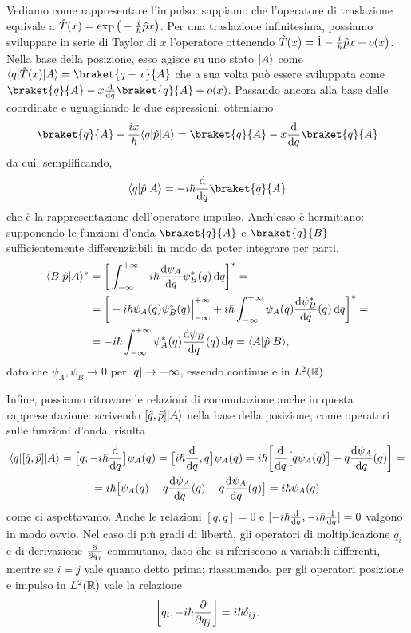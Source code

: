 Vediamo come rappresentare l'impulso: sappiamo che l'operatore di traslazione equivale a $\op T(x)=\exp\big(-\frac{i}{\hbar}\op px\big)$.
Per una traslazione infinitesima, possiamo sviluppare in serie di Taylor di $x$ l'operatore ottenendo $\op T(x)=\op 1-\frac{i}{\hbar}\op px+o(x)$.
Nella base della posizione, esso agisce su uno stato $\ket{A}$ come $\bra{q}\op T(x)\ket{A}=\braket{q-x}{A}$ che a sua volta può essere sviluppata come $\braket{q}{A}-x\drv{}{q}\braket{q}{A}+o(x)$.
Passando ancora alla base delle coordinate e uguagliando le due espressioni, otteniamo
\begin{equation}
	\braket{q}{A}-\frac{ix}{\hbar}\bra{q}\op p\ket{A}=\braket{q}{A}-x\drv{}{q}\braket{q}{A}
\end{equation}
da cui, semplificando,
\begin{equation}
	\bra{q}\op p\ket{A}=-i\hbar\drv{}{q}\braket{q}{A}
\end{equation}
che è la rappresentazione dell'operatore impulso.
Anch'esso è hermitiano: supponendo le funzioni d'onda $\braket{q}{A}$ e $\braket{q}{B}$ sufficientemente differenziabili in modo da poter integrare per parti,
\begin{equation}
	\begin{split}
		\bra{B}\op p\ket{A}^*&=\bigg[\int_{-\infty}^{+\infty}-i\hbar\drv{\psi_A}{q}\psi_B^*(q)\,\dd q\bigg]^*=\\
		&=\bigg[-i\hbar\psi_A(q)\psi_B^*(q)\Big|_{-\infty}^{+\infty}+i\hbar\int_{-\infty}^{+\infty}\psi_A(q)\drv{\psi_B^*}{q}(q)\,\dd q\bigg]^*=\\
		&=-i\hbar\int_{-\infty}^{+\infty}\psi_A^*(q)\drv{\psi_B}{q}(q)\,\dd q=\bra{A}\op p\ket{B},
	\end{split}
\end{equation}
dato che $\psi_A,\psi_B\to 0$ per $\abs{q}\to+\infty$, essendo continue e in $\leb[2]{\R}$.

Infine, possiamo ritrovare le relazioni di commutazione anche in questa rappresentazione: scrivendo $[\op q,\op p]\ket{A}$ nella base della posizione, come operatori sulle funzioni d'onda, risulta
\begin{multline}
	\bra{q}[\op q,\op p]\ket{A}=\big[q,-i\hbar\drv{}{q}\big]\psi_A(q)=\big[i\hbar\drv{}{q},q\big]\psi_A(q)=i\hbar\bigg[\drv{}{q}\big[q\psi_A(q)\big]-q\drv{\psi_A}{q}(q)\bigg]=\\
	=i\hbar\big[\psi_A(q)+q\drv{\psi_A}{q}(q)-q\drv{\psi_A}{q}(q)\big]=i\hbar\psi_A(q)
\end{multline}
come ci aspettavamo.
Anche le relazioni $[q,q]=0$ e $[-i\hbar\drv{}{q},-i\hbar\drv{}{q}]=0$ valgono in modo ovvio.
Nel caso di più gradi di libertà, gli operatori di moltiplicazione $q_i$ e di derivazione $\drp{}{q_j}$ commutano, dato che si riferiscono a variabili differenti, mentre se $i=j$ vale quanto detto prima; riassumendo, per gli operatori posizione e impulso in $\leb[2]{\R}$ vale la relazione
\begin{equation}
	\bigg[q_i,-i\hbar\drp{}{q_j}\bigg]=i\hbar\delta_{ij}.
	\label{eq:commutatori-fondamentali-L2}
\end{equation}

